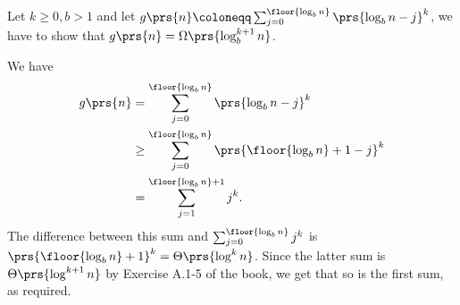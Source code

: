 \documentclass[oneside]{scrbook}
\theoremstyle{definition}
\begin{document}
\begin{exercise}
Let $k \geq 0, b > 1$ and let $g\prs{n} \coloneqq \sum_{j=0}^{\floor{\log_b n}} \prs{\log_b n - j}^k$, we have to show that $g\prs{n} = \Omega\prs{\log_b^{k+1} n}$.

We have
\begin{align*}
g\prs{n} &= \sum_{j=0}^{\floor{\log_b n}} \prs{\log_b n - j}^k
\\&\geq \sum_{j=0}^{\floor{\log_b n}} \prs{\floor{\log_b n} + 1 - j}^k
\\&= \sum_{j=1}^{\floor{\log_b n}+1} j^k \text{.}
\end{align*}
The difference between this sum and $\sum_{j=0}^{\floor{\log_b n}} j^k$ is $\prs{\floor{\log_b n} + 1}^k = \Theta\prs{\log^k n}$. Since the latter sum is $\Theta\prs{\log^{k+1} n}$ by Exercise A.1-5 of the book, %
we get that so is the first sum, as required.
\end{exercise}
\end{document}
